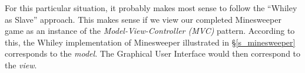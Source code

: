 For this particular situation, it probably makes most sense to follow the ``Whiley as Slave'' approach.  This makes sense if we view our completed Minesweeper game as an instance of the {\em Model-View-Controller (MVC)} pattern.  According to this, the Whiley implementation of Minesweeper illustrated in \S\ref{s_minesweeper} corresponds to the {\em model}.  The Graphical User Interface would then correspond to the {\em view}.






